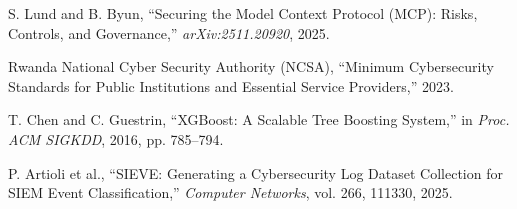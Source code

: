 \documentclass[12pt]{article}
\begin{document}
\begin{enumerate}[leftmargin=*, label={[\arabic*]}]
\item S. Lund and B. Byun, ``Securing the Model Context Protocol (MCP): Risks, Controls, and Governance,'' \textit{arXiv:2511.20920}, 2025.

\item Rwanda National Cyber Security Authority (NCSA), ``Minimum Cybersecurity Standards for Public Institutions and Essential Service Providers,'' 2023.

\item T. Chen and C. Guestrin, ``XGBoost: A Scalable Tree Boosting System,'' in \textit{Proc. ACM SIGKDD}, 2016, pp. 785--794.

\item P. Artioli et al., ``SIEVE: Generating a Cybersecurity Log Dataset Collection for SIEM Event Classification,'' \textit{Computer Networks}, vol. 266, 111330, 2025.

\end{enumerate}
\end{document}
